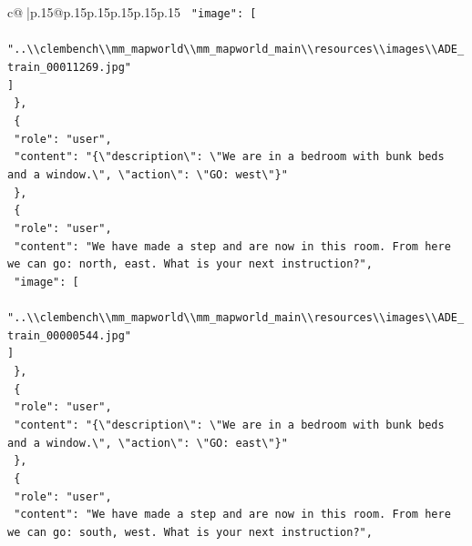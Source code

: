 \documentclass{article}
\begin{document}
{\begin{supertabular}{c@{$\;$}|p{.15\linewidth}@{}p{.15\linewidth}p{.15\linewidth}p{.15\linewidth}p{.15\linewidth}p{.15\linewidth}}
{{{\texttt{    "image": {[}} \\
\texttt{      "..\textbackslash{}\textbackslash{}clembench\textbackslash{}\textbackslash{}mm\_mapworld\textbackslash{}\textbackslash{}mm\_mapworld\_main\textbackslash{}\textbackslash{}resources\textbackslash{}\textbackslash{}images\textbackslash{}\textbackslash{}ADE\_train\_00011269.jpg"} \\
\texttt{    {]}} \\
\texttt{  \},} \\
\texttt{  \{} \\
\texttt{    "role": "user",} \\
\texttt{    "content": "\{\textbackslash{}"description\textbackslash{}": \textbackslash{}"We are in a bedroom with bunk beds and a window.\textbackslash{}", \textbackslash{}"action\textbackslash{}": \textbackslash{}"GO: west\textbackslash{}"\}"} \\
\texttt{  \},} \\
\texttt{  \{} \\
\texttt{    "role": "user",} \\
\texttt{    "content": "We have made a step and are now in this room. From here we can go: north, east. What is your next instruction?",} \\
\texttt{    "image": {[}} \\
\texttt{      "..\textbackslash{}\textbackslash{}clembench\textbackslash{}\textbackslash{}mm\_mapworld\textbackslash{}\textbackslash{}mm\_mapworld\_main\textbackslash{}\textbackslash{}resources\textbackslash{}\textbackslash{}images\textbackslash{}\textbackslash{}ADE\_train\_00000544.jpg"} \\
\texttt{    {]}} \\
\texttt{  \},} \\
\texttt{  \{} \\
\texttt{    "role": "user",} \\
\texttt{    "content": "\{\textbackslash{}"description\textbackslash{}": \textbackslash{}"We are in a bedroom with bunk beds and a window.\textbackslash{}", \textbackslash{}"action\textbackslash{}": \textbackslash{}"GO: east\textbackslash{}"\}"} \\
\texttt{  \},} \\
\texttt{  \{} \\
\texttt{    "role": "user",} \\
\texttt{    "content": "We have made a step and are now in this room. From here we can go: south, west. What is your next instruction?",} \\
}}}
\end{supertabular}}
\end{document}
